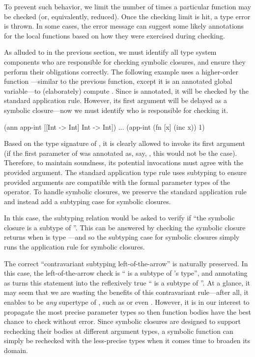 To prevent such behavior, we limit the number of times a particular
function may be checked (or, equivalently, reduced).
Once the checking limit is hit, a type error is thrown.
In some cases, the error message can suggest some likely
annotations for the local functions based on how they
were exercised during checking.

As alluded to in the previous section, we must identify
all type system components who are responsible for checking symbolic closures,
and ensure they perform their obligations correctly.
The following example uses a higher-order function
---similar to the previous 
function, except it is an annotated global
variable---to (elaborately) compute .
Since  is annotated, it will be checked
by the standard application rule.
However, its first argument will be delayed as a symbolic
closure---now we must identify who is responsible for checking it.

\begin{cljlisting}
(ann app-int [[Int -> Int] Int -> Int])
...
(app-int (fn [x] (inc x)) 1)
\end{cljlisting}

Based on the type signature of ,
it is clearly allowed to invoke its first argument
(if the first parameter of  was annotated as, say,
, this would not be the case).
Therefore, to maintain soundness, its potential invocations must
agree with the provided argument.
The standard application type rule uses subtyping to ensure
provided arguments are compatible with the formal parameter types of
the operator.
To handle symbolic closures, we preserve the standard application rule
and instead add a subtyping case for symbolic closures.

In this case, the subtyping relation would be asked to verify if
``the symbolic closure 
is a subtype of ''.
This can be answered by checking the symbolic closure
returns  when 
 is type ---and so the subtyping case for
symbolic closures simply runs the application rule
for symbolic closures.

The correct ``contravariant subtyping left-of-the-arrow''
is naturally preserved.
In this case, the left-of-the-arrow check is `` is a subtype of 's type'', and
annotating  as  turns this statement into the reflexively true `` is a subtype of ''.
At a glance, it may seem that we are wasting the benefits
of this contravariant rule---after all, it enables  to be \emph{any} supertype of
, such as  or even .
However, it is in our interest to propagate the most precise parameter types
so then function bodies have the best chance to check without error.
Since symbolic closures are designed to support rechecking their bodies at different argument types,
a symbolic function can simply be rechecked with the less-precise types
when it comes time to broaden its domain.

